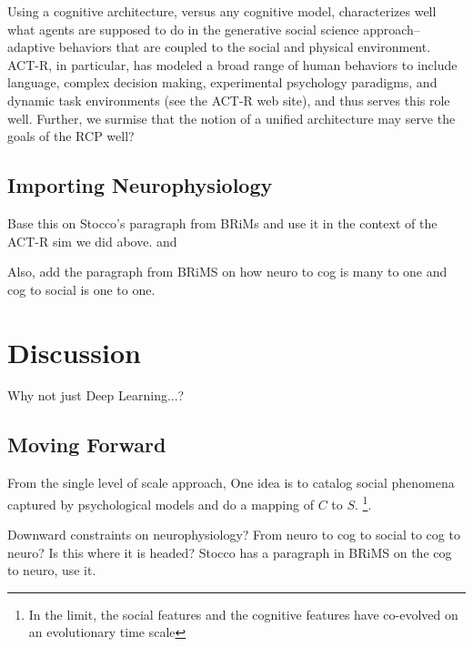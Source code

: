 \documentclass{article}
\begin{document}
Using a cognitive architecture, versus any cognitive model, characterizes well what agents are supposed to do in the generative social science approach--adaptive behaviors that are coupled to the social and physical environment.  ACT-R, in particular, has modeled a broad range of human behaviors to include language, complex decision making, experimental psychology paradigms, and dynamic task environments (see the ACT-R web site\cite{ACTRWEBSITE}), and thus serves this role well.  Further, we surmise that the notion of a unified architecture may serve the goals of the RCP well?


\subsection{Importing Neurophysiology}
Base this on Stocco's paragraph from BRiMs and use it in the context of the ACT-R sim we did above. and 

Also, add the paragraph from BRiMS on how neuro to cog is many to one and cog to social is one to one.


\section{Discussion}
Why not just Deep Learning...?  

\subsection{Moving Forward}
From the single level of scale approach, One idea is to catalog social phenomena captured by psychological models and do a mapping of $C$ to $S$. \footnote{In the limit, the social features and the cognitive features have co-evolved on an evolutionary time scale}.

Downward constraints on neurophysiology? From neuro to cog to social to cog to neuro?  Is this where it is headed? Stocco has a paragraph in BRiMS on the cog to neuro, use it.



  






\end{document}
